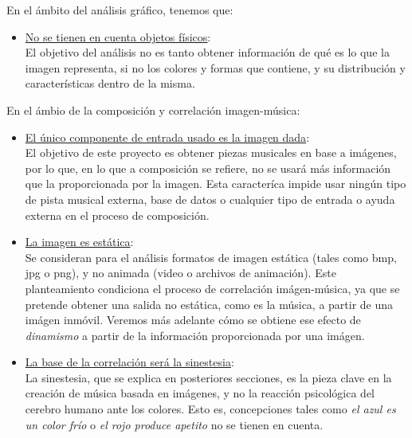 		
		En el ámbito del análisis gráfico, tenemos que:
		\begin{itemize}
		
		\item \underline{No se tienen en cuenta objetos físicos}:\\
			El objetivo del análisis no es tanto obtener información de qué es lo que la imagen representa, si no los colores y formas que contiene, y su distribución y características dentro de la misma.
		\end{itemize}
		
		En el ámbio de la composición y correlación imagen-música:
		
		\begin{itemize}
		
		\item \underline{El único componente de entrada usado es la imagen dada}:\\
			El objetivo de este proyecto es obtener piezas musicales en base a imágenes, por lo que, en lo que a composición se refiere, no se usará más información que la proporcionada por la imagen. Esta caracteríca impide usar ningún tipo de pista musical externa, base de datos o cualquier tipo de entrada o ayuda externa en el proceso de composición.
		\item \underline{La imagen es estática}:\\
			Se consideran para el análisis formatos de imagen estática (tales como bmp, jpg o png), y no animada (video o archivos de animación). Este planteamiento condiciona el proceso de correlación imágen-música, ya que se pretende obtener una salida no estática, como es la música, a partir de una imágen inmóvil. Veremos más adelante cómo se obtiene ese efecto de \emph{dinamismo} a partir de la información proporcionada por una imágen.
		\item \underline{La base de la correlación será la sinestesia}:\\	
			La sinestesia, que se explica en posteriores secciones, es la pieza clave en la creación de música basada en imágenes, y no la reacción psicológica del cerebro humano ante los colores. Esto es, concepciones tales como \emph{el azul es un color frío} o \emph{el rojo produce apetito} no se tienen en cuenta.\\

\end{itemize}
